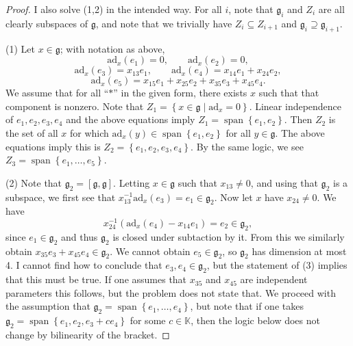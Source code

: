 \documentclass[11pt, letterpaper]{article}
\theoremstyle{plain}
\begin{document}
\begin{proof}
	I also solve (1,2) in the intended way. For all $i$, note that $\mathfrak{g} _i$ and $Z_i$ are all clearly subspaces of $\mathfrak{g} $, and note that we trivially have $Z_i \subseteq Z_{i+1} $ and $\mathfrak{g} _i \supseteq \mathfrak{g} _{i+1} $.

	(1) Let $x\in \mathfrak{g} $; with notation as above,
	\[
		\mathrm{ad}_x(e_1) = 0,\qquad \mathrm{ad}_x(e_2)=0,
	\]
	\[
		\mathrm{ad} _x(e_3) = x_{13} e_1,\qquad \mathrm{ad} _x(e_4)=x_{14} e_1 + x_{24} e_2,
	\]
	\[
		\mathrm{ad} _x(e_5) = x_{15} e_1 + x_{25} e_2 + x_{35} e_3 + x_{45} e_4
	.\]
	We assume that for all ``$*$'' in the given form, there exists $x$ such that that component is nonzero. Note that $Z_1 = \left\{ x\in \mathfrak{g} \mid \mathrm{ad}_x=0 \right\} $. Linear independence of $e_1,e_2,e_3,e_4$ and the above equations imply $Z_1 = \operatorname{span} \left\{ e_1,e_2 \right\} $. Then $Z_2$ is the set of all $x$ for which $\mathrm{ad} _x(y)\in \operatorname{span} \left\{ e_1,e_2 \right\} $ for all $y\in \mathfrak{g} $. The above equations imply this is $Z_2 = \left\{ e_1,e_2,e_3,e_4 \right\} $. By the same logic, we see $Z_3 = \operatorname{span} \left\{ e_1, \ldots ,e_5 \right\} $.

	(2) Note that $\mathfrak{g} _2 = [\mathfrak{g} ,\mathfrak{g} ]$. Letting $x\in \mathfrak{g} $ such that $x_{13} \neq 0$, and using that $\mathfrak{g} _2$ is a subspace, we first see that $x_{13} ^{-1} \mathrm{ad} _x(e_3) = e_1\in \mathfrak{g} _2$. Now let $x$ have $x_{24} \neq 0$. We have
	\[
		x_{24} ^{-1} \left(\mathrm{ad} _x(e_4) - x_{14} e_1 \right)= e_2\in \mathfrak{g} _2,
	\]
	since $e_1\in \mathfrak{g}_2$ and thus $\mathfrak{g} _2$ is closed under subtaction by it. From this we similarly obtain $x_{35} e_3 + x_{45} e_4\in \mathfrak{g}_2$. We cannot obtain $e_5\in \mathfrak{g} _2$, so $\mathfrak{g} _2$ has dimension at most 4. I cannot find how to conclude that $e_3,e_4\in \mathfrak{g} _2$, but the statement of (3) implies that this must be true. If one assumes that $x_{35} $ and $x_{45} $ are independent parameters this follows, but the problem does not state that. We proceed with the assumption that $\mathfrak{g} _2 = \operatorname{span} \left\{ e_1, \ldots ,e_4 \right\} $, but note that if one takes $\mathfrak{g} _2 = \operatorname{span} \left\{ e_1, e_2, e_3 + ce_4 \right\} $ for some $c\in\mathbb{K} $, then the logic below does not change by bilinearity of the bracket.


\end{proof}
\end{document}
